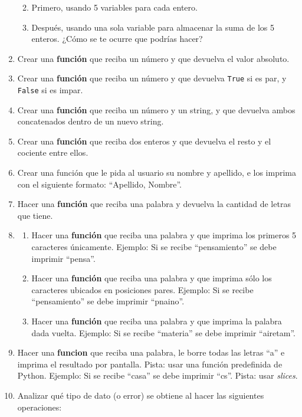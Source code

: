 \documentclass[
  letterpaper,
  DIV=11,
  numbers=noendperiod]{scrreprt}
\providecommand{\tightlist}{%
  \setlength{\itemsep}{0pt}\setlength{\parskip}{0pt}}\usepackage{longtable,booktabs,array}
\begin{document}
\begin{enumerate}
  \begin{enumerate}
  \def\labelenumii{\alph{enumii}.}
  \tightlist
  \item
    Primero, usando 5 variables para cada entero.
  \item
    Después, usando una sola variable para almacenar la suma de los 5
    enteros. ¿Cómo se te ocurre que podrías hacer?
  \end{enumerate}
\item
  Crear una \textbf{función} que reciba un número y que devuelva el
  valor absoluto.
\item
  Crear una \textbf{función} que reciba un número y que devuelva
  \texttt{True} si es par, y \texttt{False} si es impar.
\item
  Crear una \textbf{función} que reciba un número y un string, y que
  devuelva ambos concatenados dentro de un nuevo string.
\item
  Crear una \textbf{función} que reciba dos enteros y que devuelva el
  resto y el cociente entre ellos.
\item
  Crear una función que le pida al usuario su nombre y apellido, e los
  imprima con el siguiente formato: ``Apellido, Nombre''.
\item
  Hacer una \textbf{función} que reciba una palabra y devuelva la
  cantidad de letras que tiene.
\item
  \begin{enumerate}
  \def\labelenumii{\alph{enumii}.}
  \tightlist
  \item
    Hacer una \textbf{función} que reciba una palabra y que imprima los
    primeros 5 caracteres únicamente. Ejemplo: Si se recibe
    ``pensamiento'' se debe imprimir ``pensa''.
  \item
    Hacer una \textbf{función} que reciba una palabra y que imprima sólo
    los caracteres ubicados en posiciones pares. Ejemplo: Si se recibe
    ``pensamiento'' se debe imprimir ``pnaino''.
  \item
    Hacer una \textbf{función} que reciba una palabra y que imprima la
    palabra dada vuelta. Ejemplo: Si se recibe ``materia'' se debe
    imprimir ``airetam''.
  \end{enumerate}
\item
  Hacer una \textbf{funcion} que reciba una palabra, le borre todas las
  letras ``a'' e imprima el resultado por pantalla. Pista: usar una
  función predefinida de Python. Ejemplo: Si se recibe ``casa'' se debe
  imprimir ``cs''. Pista: usar \emph{slices}.
\item
  Analizar qué tipo de dato (o error) se obtiene al hacer las siguientes
  operaciones:


\end{enumerate}
\end{document}
